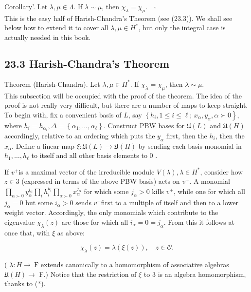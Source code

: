 \documentclass[10pt]{article}
\begin{document}
Corollary'. Let $\lambda, \mu \in \Lambda$. If $\lambda \sim \mu$, then $\chi_{\lambda}=\chi_{\mu} . \quad \square$\\
This is the easy half of Harish-Chandra's Theorem (see (23.3)). We shall see below how to extend it to cover all $\lambda, \mu \in H^{*}$, but only the integral case is actually needed in this book.

\subsection*{23.3 Harish-Chandra's Theorem}
Theorem (Harish-Chandra). Let $\lambda, \mu \in H^{*}$. If $\chi_{\lambda}=\chi_{\mu}$, then $\lambda \sim \mu$.\\
This subsection will be occupied with the proof of the theorem. The idea of the proof is not really very difficult, but there are a number of maps to keep straight. To begin with, fix a convenient basis of $L$, say $\left\{h_{i}, 1 \leq i \leq \ell\right.$; $\left.x_{\alpha}, y_{\alpha}, \alpha \succ 0\right\}$, where $h_{i}=h_{\alpha_{i}}, \Delta=\left\{\alpha_{1}, \ldots, \alpha_{\ell}\right\}$. Construct PBW bases for $\mathfrak{U}(L)$ and $\mathfrak{U}(H)$ accordingly, relative to an ordering which puts the $y_{\alpha}$ first, then the $h_{i}$, then the $x_{\alpha}$. Define a linear map $\xi: \mathfrak{U}(L) \rightarrow \mathfrak{U}(H)$ by sending each basis monomial in $h_{1}, \ldots, h_{\ell}$ to itself and all other basis elements to 0 .

If $v^{+}$is a maximal vector of the irreducible module $V(\lambda), \lambda \in H^{*}$, consider how $z \in 3$ (expressed in terms of the above PBW basis) acts on $v^{+}$. A monomial $\prod_{\alpha \succ 0} y_{\alpha}^{i_{\alpha}} \prod_{i} h_{i}^{k_{i}} \prod_{\alpha \succ 0} x_{\alpha}^{j_{\alpha}}$ for which some $j_{\alpha}>0$ kills $v^{+}$, while one for which all $j_{\alpha}=0$ but some $i_{\alpha}>0$ sends $v^{+}$first to a multiple of itself and then to a lower weight vector. Accordingly, the only monomials which contribute to the eigenvalue $\chi_{\lambda}(z)$ are those for which all $i_{\alpha}=0=j_{\alpha}$. From this it follows at once that, with $\xi$ as above:


\begin{equation*}
\chi_{\lambda}(z)=\lambda(\xi(z)), \quad z \in \mathcal{O} . \tag{*}
\end{equation*}


( $\lambda: H \rightarrow \mathrm{~F}$ extends canonically to a homomorphism of associative algebras $\mathfrak{U}(H) \rightarrow$ F.) Notice that the restriction of $\xi$ to 3 is an algebra homomorphism, thanks to (*).
\end{document}
